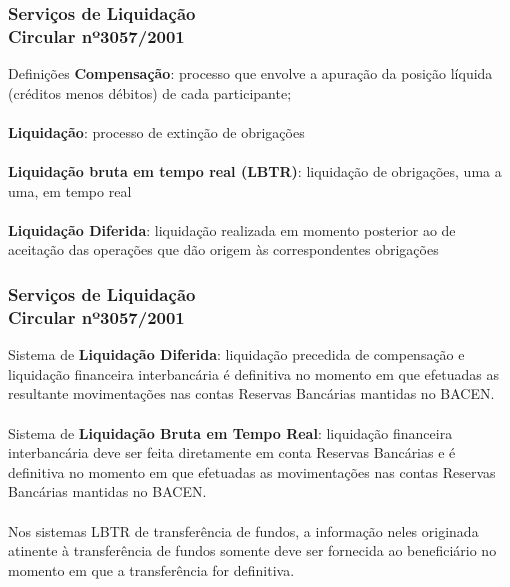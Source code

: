 \documentclass[10pt]{beamer}
\begin{document}
\begin{frame} 
\frametitle{Serviços de Liquidação\\Circular nº3057/2001}

\begin{block}{Definições}
	\textbf{Compensação}: processo que envolve a apuração da posição líquida (créditos menos débitos) de cada participante;
	\\~\\
	\textbf{Liquidação}: processo de extinção de obrigações
	\\~\\
	\textbf{Liquidação bruta em tempo real (LBTR)}: liquidação de obrigações, uma a uma, em tempo real
	\\~\\
	\textbf{Liquidação Diferida}: liquidação realizada em momento posterior ao de aceitação das operações que dão origem às correspondentes obrigações
\end{block}

\end{frame}

\begin{frame} 
\frametitle{Serviços de Liquidação\\Circular nº3057/2001}

Sistema de \textbf{Liquidação Diferida}: liquidação precedida de compensação e liquidação financeira interbancária é definitiva no momento em que efetuadas as resultante movimentações nas contas Reservas Bancárias mantidas no BACEN.
\\~\\
Sistema de \textbf{Liquidação Bruta em Tempo Real}: liquidação financeira interbancária deve ser feita diretamente em conta Reservas Bancárias e é definitiva no momento em que efetuadas as movimentações nas contas Reservas Bancárias mantidas no BACEN.
\\~\\
Nos sistemas LBTR de transferência de fundos, a informação neles originada atinente à transferência de fundos somente deve ser fornecida ao beneficiário no momento em que a transferência for definitiva. 

\end{frame}
\end{document}
